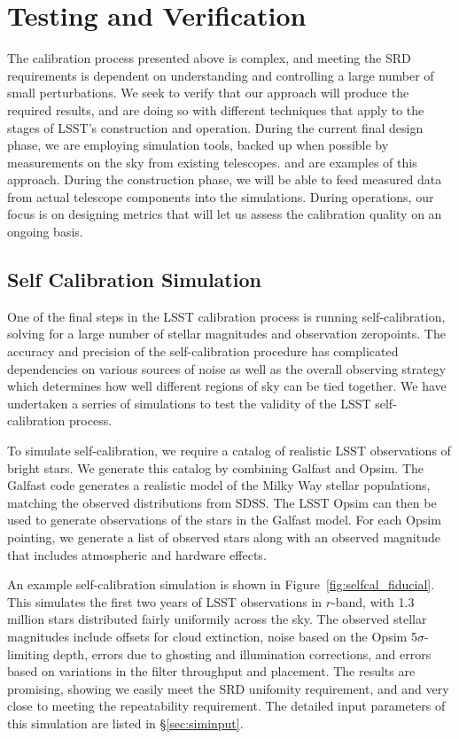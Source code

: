 \documentclass[12pt,preprint]{aastex}
\begin{document}
\section{Testing and Verification}
\label{sec:verification}

The calibration process presented above is complex, and meeting the SRD requirements
is dependent on understanding and controlling a large number of small perturbations.  We seek to verify that our approach will produce the required results, and are doing so with different techniques that apply to the stages of LSST's construction and operation.   During the current final design phase, we are employing simulation tools, backed up when possible by measurements on the sky from existing telescopes.   \citep{Burke2013} and \citep{Burke2010b} are examples of this approach.  During the construction phase, we will be able to feed measured data from actual telescope components into the simulations.   During operations, our focus is on designing metrics that will let us assess the calibration quality on an ongoing basis.

\subsection{Self Calibration Simulation}
\label{sec:selfcalsim}

One of the final steps in the LSST calibration process is running self-calibration, solving for a large number of stellar magnitudes and observation zeropoints.  The accuracy and precision of the self-calibration procedure has complicated dependencies on various sources of noise as well as the overall observing strategy which determines how well different regions of sky can be tied together.  We have undertaken a serries of simulations to test the validity of the LSST self-calibration process.

To simulate self-calibration, we require a catalog of realistic LSST observations of bright stars.  We generate this catalog by combining Galfast and Opsim.  The Galfast code generates a realistic model of the Milky Way stellar populations, matching the observed distributions from SDSS.  The LSST Opsim can then be used to generate observations of the stars in the Galfast model.  For each Opsim pointing, we generate a list of observed stars along with an observed magnitude that includes atmospheric and hardware effects.  

An example self-calibration simulation is shown in Figure~\ref{fig:selfcal_fiducial}.  This simulates the first two years of LSST observations in $r$-band, with 1.3 million stars distributed fairly uniformily across the sky.  The observed stellar magnitudes include offsets for cloud extinction, noise based on the Opsim 5$\sigma$-limiting depth, errors due to ghosting and illumination corrections, and errors based on variations in the filter throughput and placement.  The results are promising, showing we easily meet the SRD unifomity requirement, and and very close to meeting the repeatability requirement.  The detailed input parameters of this simulation are listed in \S\ref{sec:siminput}.
\end{document}
